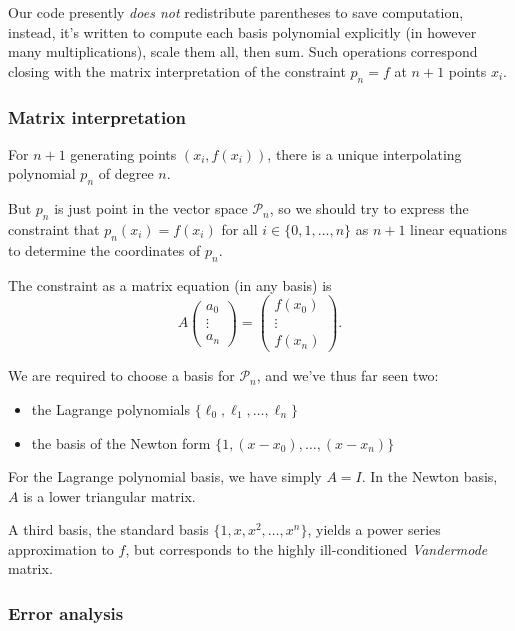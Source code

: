 \documentclass{article}
\providecommand{\tightlist}{%
      \setlength{\itemsep}{0pt}\setlength{\parskip}{0pt}}
\begin{document}
Our code presently \emph{does not} redistribute parentheses to save
computation, instead, it's written to compute each basis polynomial
explicitly (in however many multiplications), scale them all, then sum.
Such operations correspond closing with the matrix interpretation of the
constraint \(p_n = f\) at \(n+1\) points \(x_i\).

\hypertarget{matrix-interpretation}{%
\subsubsection{Matrix interpretation}\label{matrix-interpretation}}

For \(n+1\) generating points \((x_i,f(x_i))\), there is a unique
interpolating polynomial \(p_n\) of degree \(n\).

But \(p_n\) is just point in the vector space \(\mathcal{P}_n\), so we
should try to express the constraint that \(p_n(x_i) = f(x_i)\) for all
\(i \in \{0,1,\ldots,n\}\) as \(n+1\) linear equations to determine the
coordinates of \(p_n\).

The constraint as a matrix equation (in any basis) is
\[A \begin{pmatrix}a_0\\ \vdots\\ a_n\end{pmatrix} = \begin{pmatrix}f(x_0)\\ \vdots\\ f(x_n)\end{pmatrix}.\]

We are required to choose a basis for \(\mathcal{P}_n\), and we've thus
far seen two:

\begin{itemize}
\tightlist
\item
  the Lagrange polynomials \(\{\ell_0, \ell_1, \ldots, \ell_n\}\)
\item
  the basis of the Newton form \(\{1, (x-x_0), \ldots, (x-x_n)\}\)
\end{itemize}

For the Lagrange polynomial basis, we have simply \(A = I\). In the
Newton basis, \(A\) is a lower triangular matrix.

A third basis, the standard basis \(\{1,x,x^2,\ldots, x^n\}\), yields a
power series approximation to \(f\), but corresponds to the highly
ill-conditioned \emph{Vandermode} matrix.

\hypertarget{error-analysis}{%
\subsubsection{Error analysis}\label{error-analysis}}
\end{document}
